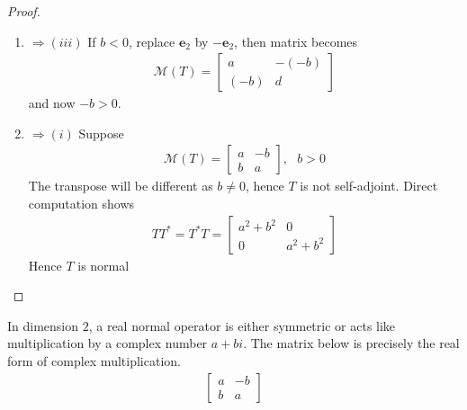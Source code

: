 \begin{lemma}
\begin{proof}
\begin{enumerate}[label=\roman*.]
\begin{align}
\mathcal{M}(T) =
\begin{bmatrix}
a & -b \\
b & d
\end{bmatrix} \nonumber
\end{align}
Because $T$ is not self-adjoint, $b \neq 0$.
\item[$(ii)$]$\Rightarrow (iii)$ If $b < 0$, replace $\mathbf{e}_2$ by $-\mathbf{e}_2$, then matrix becomes
\begin{align}
\mathcal{M}(T) =
\begin{bmatrix}
a & -(-b) \\
(-b) & d
\end{bmatrix} \nonumber
\end{align}
and now $-b > 0$.
\item[$(iii)$]$\Rightarrow (i)$ Suppose
\begin{align}
\mathcal{M}(T) =
\begin{bmatrix}
a & -b \\
b & a
\end{bmatrix}, \ \ \ b > 0 \nonumber
\end{align}
The transpose will be different as $b \neq 0$, hence $T$ is not self-adjoint. Direct computation shows
\begin{align}
TT^* = T^* T =
\begin{bmatrix}
a^2 + b^2 & 0 \\
0 & a^2 + b^2
\end{bmatrix} \nonumber
\end{align}
Hence $T$ is normal
\end{enumerate}
\end{proof}
\end{lemma}

In dimension $2$, a real normal operator is either symmetric or acts like multiplication by a complex number $a+bi$. The matrix below is precisely the real form of complex multiplication.
\begin{align}
\begin{bmatrix}
a & -b \\
b & a
\end{bmatrix} \nonumber
\end{align}


